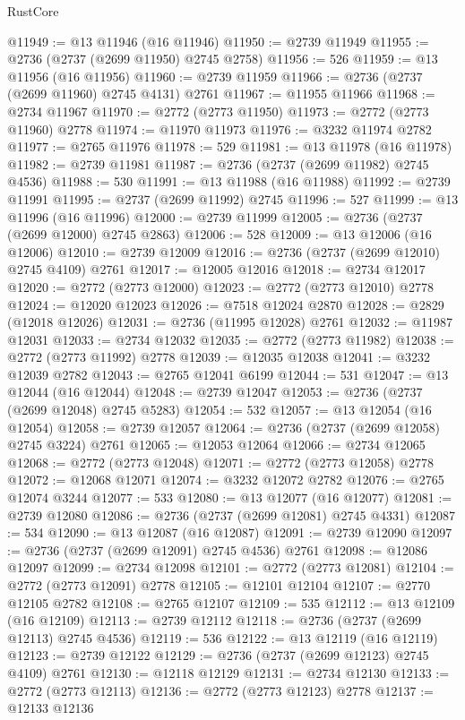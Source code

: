 \begin{lexlean}{RustCore}
\begin{coremodule}
@11949 := @13 @11946 (@16 @11946)
@11950 := @2739 @11949
@11955 := @2736 (@2737 (@2699 @11950) @2745 @2758)
@11956 := 526
@11959 := @13 @11956 (@16 @11956)
@11960 := @2739 @11959
@11966 := @2736 (@2737 (@2699 @11960) @2745 @4131) @2761
@11967 := @11955 @11966
@11968 := @2734 @11967
@11970 := @2772 (@2773 @11950)
@11973 := @2772 (@2773 @11960) @2778
@11974 := @11970 @11973
@11976 := @3232 @11974 @2782
@11977 := @2765 @11976
@11978 := 529
@11981 := @13 @11978 (@16 @11978)
@11982 := @2739 @11981
@11987 := @2736 (@2737 (@2699 @11982) @2745 @4536)
@11988 := 530
@11991 := @13 @11988 (@16 @11988)
@11992 := @2739 @11991
@11995 := @2737 (@2699 @11992) @2745
@11996 := 527
@11999 := @13 @11996 (@16 @11996)
@12000 := @2739 @11999
@12005 := @2736 (@2737 (@2699 @12000) @2745 @2863)
@12006 := 528
@12009 := @13 @12006 (@16 @12006)
@12010 := @2739 @12009
@12016 := @2736 (@2737 (@2699 @12010) @2745 @4109) @2761
@12017 := @12005 @12016
@12018 := @2734 @12017
@12020 := @2772 (@2773 @12000)
@12023 := @2772 (@2773 @12010) @2778
@12024 := @12020 @12023
@12026 := @7518 @12024 @2870
@12028 := @2829 (@12018 @12026)
@12031 := @2736 (@11995 @12028) @2761
@12032 := @11987 @12031
@12033 := @2734 @12032
@12035 := @2772 (@2773 @11982)
@12038 := @2772 (@2773 @11992) @2778
@12039 := @12035 @12038
@12041 := @3232 @12039 @2782
@12043 := @2765 @12041 @6199
@12044 := 531
@12047 := @13 @12044 (@16 @12044)
@12048 := @2739 @12047
@12053 := @2736 (@2737 (@2699 @12048) @2745 @5283)
@12054 := 532
@12057 := @13 @12054 (@16 @12054)
@12058 := @2739 @12057
@12064 := @2736 (@2737 (@2699 @12058) @2745 @3224) @2761
@12065 := @12053 @12064
@12066 := @2734 @12065
@12068 := @2772 (@2773 @12048)
@12071 := @2772 (@2773 @12058) @2778
@12072 := @12068 @12071
@12074 := @3232 @12072 @2782
@12076 := @2765 @12074 @3244
@12077 := 533
@12080 := @13 @12077 (@16 @12077)
@12081 := @2739 @12080
@12086 := @2736 (@2737 (@2699 @12081) @2745 @4331)
@12087 := 534
@12090 := @13 @12087 (@16 @12087)
@12091 := @2739 @12090
@12097 := @2736 (@2737 (@2699 @12091) @2745 @4536) @2761
@12098 := @12086 @12097
@12099 := @2734 @12098
@12101 := @2772 (@2773 @12081)
@12104 := @2772 (@2773 @12091) @2778
@12105 := @12101 @12104
@12107 := @2770 @12105 @2782
@12108 := @2765 @12107
@12109 := 535
@12112 := @13 @12109 (@16 @12109)
@12113 := @2739 @12112
@12118 := @2736 (@2737 (@2699 @12113) @2745 @4536)
@12119 := 536
@12122 := @13 @12119 (@16 @12119)
@12123 := @2739 @12122
@12129 := @2736 (@2737 (@2699 @12123) @2745 @4109) @2761
@12130 := @12118 @12129
@12131 := @2734 @12130
@12133 := @2772 (@2773 @12113)
@12136 := @2772 (@2773 @12123) @2778
@12137 := @12133 @12136

\end{coremodule}
\end{lexlean}
